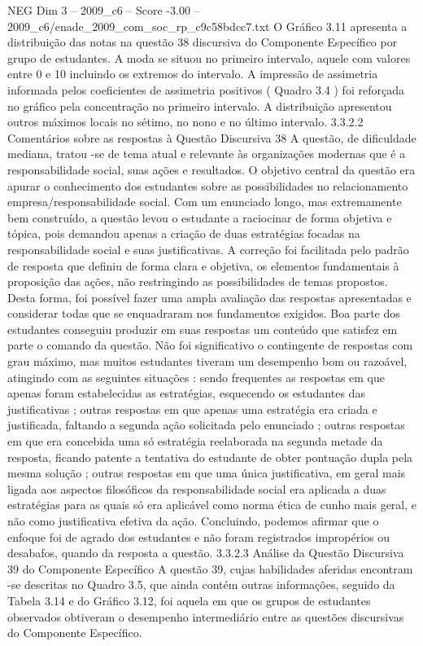 \begin{textsample}{NEG Dim 3 – 2009\_c6 – Score -3.00 – 2009\_c6/enade\_2009\_com\_soc\_rp\_c9c58bdcc7.txt}
O Gráfico 3.11 apresenta a distribuição das notas na questão 38 discursiva do Componente Específico por grupo de estudantes.
A moda se situou no primeiro intervalo, aquele com valores entre 0 e 10 incluindo os extremos do intervalo.
A impressão de assimetria informada pelos coeficientes de assimetria positivos ( Quadro 3.4 ) foi reforçada no gráfico pela concentração no primeiro intervalo.
A distribuição apresentou outros máximos locais no sétimo, no nono e no último intervalo. 3.3.2.2 Comentários sobre as respostas à Questão Discursiva 38 A questão, de dificuldade mediana, tratou -se de tema atual e relevante às organizações modernas que é a responsabilidade social, suas ações e resultados.
O objetivo central da questão era apurar o conhecimento dos estudantes sobre as possibilidades no relacionamento empresa/responsabilidade social.
Com um enunciado longo, mas extremamente bem construído, a questão levou o estudante a raciocinar de forma objetiva e tópica, pois demandou apenas a criação de duas estratégias focadas na responsabilidade social e suas justificativas.
A correção foi facilitada pelo padrão de resposta que definiu de forma clara e objetiva, os elementos fundamentais à proposição das ações, não restringindo as possibilidades de temas propostos.
Desta forma, foi possível fazer uma ampla avaliação das respostas apresentadas e considerar todas que se enquadraram nos fundamentos exigidos.
Boa parte dos estudantes conseguiu produzir em suas respostas um conteúdo que satisfez em parte o comando da questão.
Não foi significativo o contingente de respostas com grau máximo, mas muitos estudantes tiveram um desempenho bom ou razoável, atingindo com as seguintes situações : sendo frequentes as respostas em que apenas foram estabelecidas as estratégias, esquecendo os estudantes das justificativas ; outras respostas em que apenas uma estratégia era criada e justificada, faltando a segunda ação solicitada pelo enunciado ; outras respostas em que era concebida uma só estratégia reelaborada na segunda metade da resposta, ficando patente a tentativa do estudante de obter pontuação dupla pela mesma solução ; outras respostas em que uma única justificativa, em geral mais ligada aos aspectos filosóficos da responsabilidade social era aplicada a duas estratégias para as quais só era aplicável como norma ética de cunho mais geral, e não como justificativa efetiva da ação.
Concluindo, podemos afirmar que o enfoque foi de agrado dos estudantes e não foram registrados impropérios ou desabafos, quando da resposta a questão. 3.3.2.3 Análise da Questão Discursiva 39 do Componente Específico A questão 39, cujas habilidades aferidas encontram -se descritas no Quadro 3.5, que ainda contém outras informações, seguido da Tabela 3.14 e do Gráfico 3.12, foi aquela em que os grupos de estudantes observados obtiveram o desempenho intermediário entre as questões discursivas do Componente Específico.

\end{textsample}
